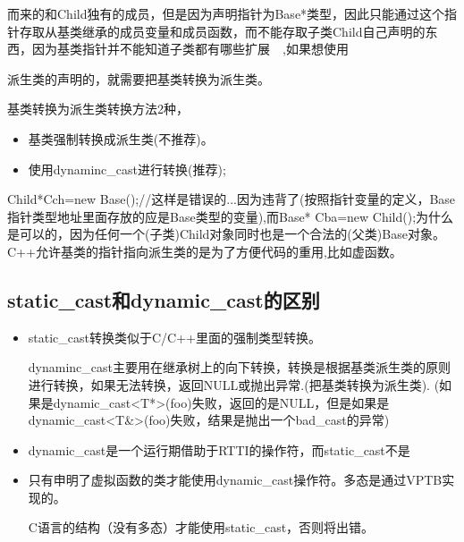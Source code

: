 \documentclass{article}
\begin{document}
\begin{CJK}{UTF8}{gbsn}
而来的和Child独有的成员，但是因为声明指针为Base*类型，因此只能通过这个指针存取从基类继承的成员变量和成员函数，而不能存取子类Child自己声明的东西，因为基类指针并不能知道子类都有哪些扩展~~,如果想使用

派生类的声明的，就需要把基类转换为派生类。

基类转换为派生类转换方法2种，
\begin{itemize}
\itemsep=-3pt
\item 基类强制转换成派生类(不推荐)。
\item 使用dynaminc\_cast进行转换(推荐);
\end{itemize}

Child*Cch=new Base();//这样是错误的...因为违背了(按照指针变量的定义，Base指针类型地址里面存放的应是Base类型的变量),而Base* Cba=new Child();为什么是可以的，因为任何一个(子类)Child对象同时也是一个合法的(父类)Base对象。C++允许基类的指针指向派生类的是为了方便代码的重用,比如虚函数。

\subsection{static\_cast和dynamic\_cast的区别}
\begin{itemize}
\itemsep=-3pt
\item static\_cast转换类似于C/C++里面的强制类型转换。   

   dynaminc\_cast主要用在继承树上的向下转换，转换是根据基类派生类的原则进行转换，如果无法转换，返回NULL或抛出异常.(把基类转换为派生类). (如果是dynamic\_cast<T*>(foo)失败，返回的是NULL，但是如果是dynamic\_cast<T\&>(foo)失败，结果是抛出一个bad\_cast的异常)

\item dynamic\_cast是一个运行期借助于RTTI的操作符，而static\_cast不是   
\item 只有申明了虚拟函数的类才能使用dynamic\_cast操作符。多态是通过VPTB实现的。   

C语言的结构（没有多态）才能使用static\_cast，否则将出错。
\end{itemize}


\end{CJK}
\end{document}
